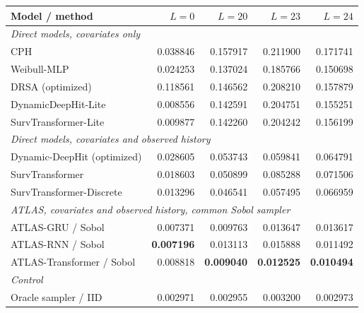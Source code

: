 \begin{center}\begin{minipage}{\textwidth}\centering\small
\begin{tabular}{lrrrr}
\toprule
Model / method & $L=0$ & $L=20$ & $L=23$ & $L=24$ \\\midrule
\multicolumn{5}{l}{\textit{Direct models, covariates only}}\\
CPH & 0.038846 & 0.157917 & 0.211900 & 0.171741 \\
Weibull-MLP & 0.024253 & 0.137024 & 0.185766 & 0.150698 \\
DRSA (optimized) & 0.118561 & 0.146562 & 0.208210 & 0.157879 \\
DynamicDeepHit-Lite & 0.008556 & 0.142591 & 0.204751 & 0.155251 \\
SurvTransformer-Lite & 0.009877 & 0.142260 & 0.204242 & 0.156199 \\
\multicolumn{5}{l}{\textit{Direct models, covariates and observed history}}\\
Dynamic-DeepHit (optimized) & 0.028605 & 0.053743 & 0.059841 & 0.064791 \\
SurvTransformer & 0.018603 & 0.050899 & 0.085288 & 0.071506 \\
SurvTransformer-Discrete & 0.013296 & 0.046541 & 0.057495 & 0.066959 \\
\multicolumn{5}{l}{\textit{ATLAS, covariates and observed history, common Sobol sampler}}\\
ATLAS-GRU / Sobol & 0.007371 & 0.009763 & 0.013647 & 0.013617 \\
ATLAS-RNN / Sobol & \textbf{0.007196} & 0.013113 & 0.015888 & 0.011492 \\
ATLAS-Transformer / Sobol & 0.008818 & \textbf{0.009040} & \textbf{0.012525} & \textbf{0.010494} \\
\multicolumn{5}{l}{\textit{Control}}\\
Oracle sampler / IID & 0.002971 & 0.002955 & 0.003200 & 0.002973 \\
\bottomrule\end{tabular}
\label{tab:hardmain}
\end{minipage}\end{center}
